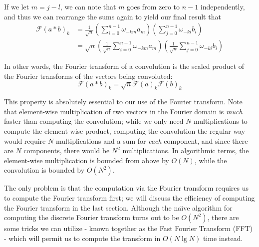 \documentclass[11pt]{article}
\newcommand\del[1]{\left(#1\right)}
\newcommand\Asterisk{*}
\begin{document}
If we let $m = j-l$, we can note that $m$ goes from zero to $n-1$ independently, and thus we can
rearrange the sums again to yield our final result that
\begin{align*}
    \mathcal{F}(a \Asterisk b)_k &= \frac{1}{\sqrt{n}} \del{\sum_{i=0}^{n-1} \omega_{-km}a_m} \del{\sum_{j=0}^{n-1}\omega_{-ki}  b_i} \\
    &= \sqrt{n}  \del{\frac{1}{\sqrt{n}}\sum_{i=0}^{n-1} \omega_{-km}a_m} \del{\frac{1}{\sqrt{n}}\sum_{j=0}^{n-1}\omega_{-ki}  b_i}
\end{align*}

In other words, the Fourier transform of a convolution is the scaled product of the Fourier
transforms of the vectors being convoluted:
\[\mathcal{F}(a \Asterisk b)_k = \sqrt{n}  \mathcal{F}(a)_k\mathcal{F}(b)_k\]

This property is absolutely essential to our use of the Fourier transform. Note that element-wise
multiplication of two vectors in the Fourier domain is \emph{much} faster than computing the
convolution; while we only need $N$ multiplications to compute the element-wise product,  computing
the convolution the regular way would require $N$ multiplications and a sum for \emph{each}
component, and since there are $N$ components, there would be $N^2$ multiplications. In algorithmic
terms, the element-wise multiplication is bounded from above by $O(N)$, while the convolution is
bounded by $O(N^2)$. 

The only problem is that the computation via the Fourier transform requires us to compute the
Fourier transform first; we will discuss the efficiency of computing the Fourier transform in the
last section. Although the na\"{\i}ve algorithm for computing the discrete Fourier transform turns
out to be $O(N^2)$, there are some tricks we can utilize - known together as the Fast Fourier
Transform (FFT) - which will permit us to compute the transform in $O(N\lg N)$ time instead.
\pagebreak
\end{document}
